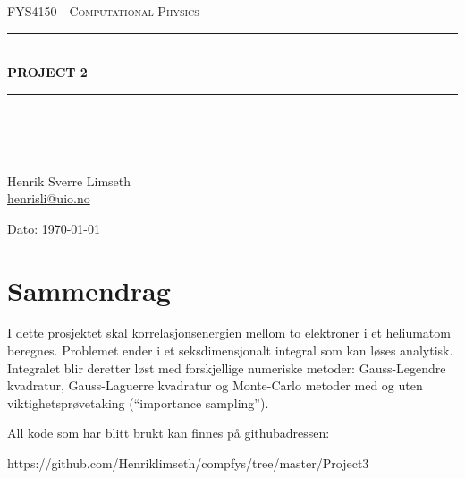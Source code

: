 \documentclass[norsk, 12pt]{article}
\begin{document}
\begin{titlepage}
\begin{center}

\textsc{\Large FYS4150 - Computational Physics}\\[0.5cm]
\rule{\linewidth}{0.5mm} \\[0.4cm]
{ \huge \bfseries  PROJECT 2}\\[0.10cm]
\rule{\linewidth}{0.5mm} \\[1.5cm]
\textsc{\Large }\\[1.5cm]
\textsc{}\\[1.5cm]

\begin{minipage}{0.49\textwidth}
    \begin{center} \large
        Henrik Sverre Limseth\\ \url{henrisli@uio.no} \\[0.8cm]
    \end{center}
\end{minipage}


\large{Dato: \today}

\end{center}
\end{titlepage}

\section{Sammendrag}
I dette prosjektet skal korrelasjonsenergien mellom to elektroner i et heliumatom beregnes. Problemet ender i et 
seksdimensjonalt integral som kan løses analytisk. Integralet blir deretter løst med forskjellige numeriske metoder:
Gauss-Legendre kvadratur, Gauss-Laguerre kvadratur og Monte-Carlo metoder med og uten viktighetsprøvetaking (``importance
sampling'').


All kode som har blitt brukt kan finnes på githubadressen:

https://github.com/Henriklimseth/compfys/tree/master/Project3
\end{document}

